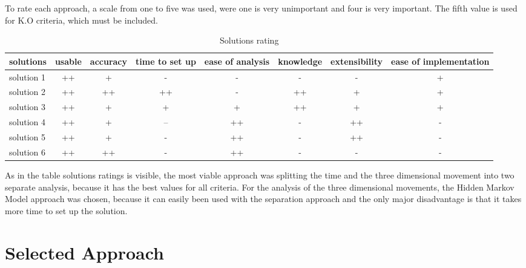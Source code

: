 To rate each approach, a scale from one to five was used, were one is very unimportant and four is very important. The fifth value is used for K.O criteria, which must be included.

\begin{table}[h]
\begin{tabular}{|l|c|c|c|c|c|c|c|}
\hline
\textbf{solutions} & usable & accuracy & time to set up & ease of analysis & knowledge & extensibility & ease of implementation \\
\hline
solution 1 &\cellcolor[HTML]{38761d}++&\cellcolor[HTML]{93c47d}+&\cellcolor[HTML]{dd7e6b}-&\cellcolor[HTML]{dd7e6b}-&\cellcolor[HTML]{dd7e6b}-&\cellcolor[HTML]{dd7e6b}-&\cellcolor[HTML]{93c47d}+ \\
\hline
solution 2 &\cellcolor[HTML]{38761d}++&\cellcolor[HTML]{38761d}++&\cellcolor[HTML]{38761d}++&\cellcolor[HTML]{dd7e6b}-&\cellcolor[HTML]{38761d}++&\cellcolor[HTML]{93c47d}+&\cellcolor[HTML]{93c47d}+\\
\hline
solution 3 &\cellcolor[HTML]{38761d}++&\cellcolor[HTML]{93c47d}+&\cellcolor[HTML]{93c47d}+&\cellcolor[HTML]{93c47d}+&\cellcolor[HTML]{38761d}++&\cellcolor[HTML]{93c47d}+&\cellcolor[HTML]{93c47d}+\\
\hline
solution 4 &\cellcolor[HTML]{38761d}++&\cellcolor[HTML]{93c47d}+&\cellcolor[HTML]{cc4125}--&\cellcolor[HTML]{38761d}++&\cellcolor[HTML]{dd7e6b}-&\cellcolor[HTML]{38761d}++&\cellcolor[HTML]{dd7e6b}-\\
\hline
solution 5 &\cellcolor[HTML]{38761d}++&\cellcolor[HTML]{93c47d}+&\cellcolor[HTML]{dd7e6b}-&\cellcolor[HTML]{38761d}++&\cellcolor[HTML]{dd7e6b}-&\cellcolor[HTML]{38761d}++&\cellcolor[HTML]{dd7e6b}- \\
\hline
solution 6 &\cellcolor[HTML]{38761d}++&\cellcolor[HTML]{38761d}++&\cellcolor[HTML]{dd7e6b}-&\cellcolor[HTML]{38761d}++&\cellcolor[HTML]{dd7e6b}-&\cellcolor[HTML]{dd7e6b}-&\cellcolor[HTML]{dd7e6b}-\\
\hline
\end{tabular}
\caption{Solutions rating}
\end{table}

As in the table solutions ratings is visible, the most viable approach was splitting the time and the three dimensional movement into two separate analysis, because it has the best values for all criteria. For the analysis of the three dimensional movements, the Hidden Markov Model approach was chosen, because it can easily been used with the separation approach and the only major disadvantage is that it takes more time to set up the solution. 

\section{Selected Approach}




